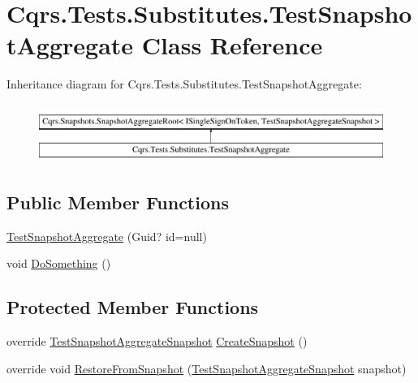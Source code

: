 \hypertarget{classCqrs_1_1Tests_1_1Substitutes_1_1TestSnapshotAggregate}{}\section{Cqrs.\+Tests.\+Substitutes.\+Test\+Snapshot\+Aggregate Class Reference}
\label{classCqrs_1_1Tests_1_1Substitutes_1_1TestSnapshotAggregate}
Inheritance diagram for Cqrs.\+Tests.\+Substitutes.\+Test\+Snapshot\+Aggregate\+:\begin{figure}[H]
\begin{center}
\leavevmode
\includegraphics[height=1.927711cm]{classCqrs_1_1Tests_1_1Substitutes_1_1TestSnapshotAggregate}
\end{center}
\end{figure}
\subsection*{Public Member Functions}
\begin{DoxyCompactItemize}
\item 
\hyperlink{classCqrs_1_1Tests_1_1Substitutes_1_1TestSnapshotAggregate_aeb457b965fe66b7cb642a79e82b3c7ce}{Test\+Snapshot\+Aggregate} (Guid? id=null)
\item 
void \hyperlink{classCqrs_1_1Tests_1_1Substitutes_1_1TestSnapshotAggregate_ae61a113a0510a62822cebf575fa7d982}{Do\+Something} ()
\end{DoxyCompactItemize}
\subsection*{Protected Member Functions}
\begin{DoxyCompactItemize}
\item 
override \hyperlink{classCqrs_1_1Tests_1_1Substitutes_1_1TestSnapshotAggregateSnapshot}{Test\+Snapshot\+Aggregate\+Snapshot} \hyperlink{classCqrs_1_1Tests_1_1Substitutes_1_1TestSnapshotAggregate_a423bba964aa7fe1f8e89fbb153d7db37}{Create\+Snapshot} ()
\item 
override void \hyperlink{classCqrs_1_1Tests_1_1Substitutes_1_1TestSnapshotAggregate_aeebfef7170bfd350e4ae2bccf11e60ee}{Restore\+From\+Snapshot} (\hyperlink{classCqrs_1_1Tests_1_1Substitutes_1_1TestSnapshotAggregateSnapshot}{Test\+Snapshot\+Aggregate\+Snapshot} snapshot)
\end{DoxyCompactItemize}
